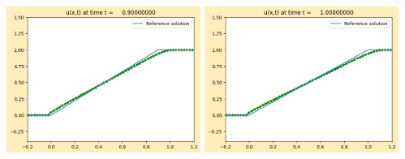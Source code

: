 \documentclass[11pt]{article}
\begin{document}
\vskip 10pt 
\includegraphics[width=0.475\textwidth]{frame0009fig0.png}
\vskip 10pt 
\includegraphics[width=0.475\textwidth]{frame0010fig0.png}
\end{document}
